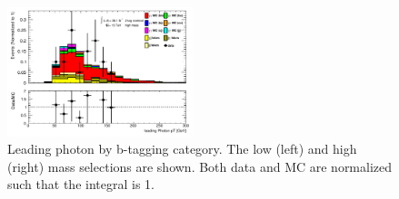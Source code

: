 \begin{figure}[htbp]
  \includegraphics[width=0.48\textwidth]{chapters/chapter5_yybb/images/data_MC_comparison/h_SR_h_2t_nominal_leadingPhoton_pt.pdf}
  \caption[Leading photon \pt.]{Leading photon \pt by b-tagging category. The low (left) and high (right) mass selections are shown. Both data and MC are normalized such that the integral is 1.
  \label{fig:photon_l_pt}}
\end{figure}

